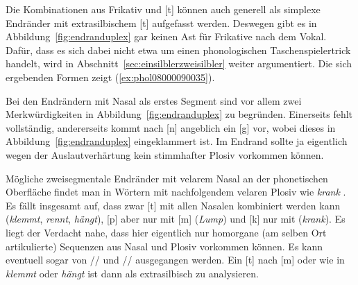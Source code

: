 Die Kombinationen aus Frikativ und [t] können auch generell als simplexe Endränder mit extrasilbischem [t] aufgefasst werden.
Deswegen gibt es in Abbildung~\ref{fig:endranduplex} gar keinen Ast für Frikative nach dem Vokal.
Dafür, dass es sich dabei nicht etwa um einen phonologischen Taschenspielertrick handelt, wird in Abschnitt~\ref{sec:einsilblerzweisilbler} weiter argumentiert.
Die sich ergebenden Formen zeigt (\ref{ex:phol08000090035}).

\begin{exe}
  \ex \label{ex:phol08000090035}
  \begin{xlist}
  \end{xlist}
\end{exe}

Bei den Endrändern mit Nasal als erstes Segment sind vor allem zwei Merkwürdigkeiten in Abbildung~\ref{fig:endranduplex} zu begründen.
Einerseits fehlt \textipa{[N]} vollständig, andererseits kommt nach [n] angeblich ein [g] vor, wobei dieses in Abbildung~\ref{fig:endranduplex} eingeklammert ist.
Im Endrand sollte ja eigentlich wegen der Auslautverhärtung kein stimmhafter Plosiv vorkommen können.

Mögliche zweisegmentale Endränder mit velarem Nasal \textipa{[N]} an der phonetischen Oberfläche findet man in Wörtern mit nachfolgendem velaren Plosiv wie \textit{krank} \textipa{[kKaNk]}.
Es fällt insgesamt auf, dass zwar [t] mit allen Nasalen kombiniert werden kann (\textit{klemmt}, \textit{rennt}, \textit{hängt}), [p] aber nur mit [m] (\textit{Lump}) und [k] nur mit \textipa{[N]} (\textit{krank}).
Es liegt der Verdacht nahe, dass hier eigentlich nur homorgane (am selben Ort artikulierte) Sequenzen aus Nasal und Plosiv vorkommen können.
Es kann eventuell sogar von // \phopro \textipa{[kKaNk]} und // \phopro \textipa{[lUmp]} ausgegangen werden.
Ein [t] nach [m] oder \textipa{[N]} wie in \textit{klemmt} oder \textit{hängt} ist dann als extrasilbisch zu analysieren.

